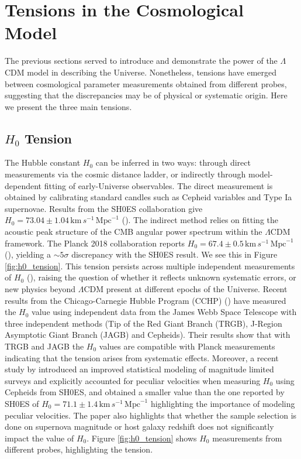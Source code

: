 \section{Tensions in the Cosmological Model} \label{sec:tensions}

The previous sections served to introduce and demonstrate the power of the $\Lambda$CDM model in describing the Universe. Nonetheless, tensions have emerged 
between cosmological parameter measurements obtained from different probes, suggesting that the discrepancies may be of physical or systematic origin. 
Here we present the three main tensions. \\

\subsection{$H_0$ Tension}

The Hubble constant $H_0$ can be inferred in two ways: through direct measurements via the cosmic distance ladder, or indirectly through model-dependent fitting of 
early-Universe observables. The direct measurement is obtained by calibrating standard candles such as Cepheid variables and Type Ia supernovae. 
Results from the SH0ES collaboration give $H_0 = 73.04 \pm 1.04\,\text{km}\,s^{-1}\,\text{Mpc}^{-1}$ (\cite{Riess_2022}). The indirect method relies on fitting the acoustic peak 
structure of the CMB angular power spectrum within the $\Lambda$CDM framework. The Planck 2018 collaboration reports $H_0 = 67.4 \pm 0.5\,\text{km}\,s^{-1}\,\text{Mpc}^{-1}$ 
(\cite{Planck_2018_params}), yielding a $\sim 5\sigma$ discrepancy with the SH0ES result. We see this in Figure \ref{fig:h0_tension}. This tension persists across multiple independent measurements of $H_0$ 
(\cite{DiValentino_2021}), raising the question of whether it reflects unknown systematic errors, or new physics beyond $\Lambda$CDM present at different 
epochs of the Universe. Recent results from the Chicago-Carnegie Hubble Program (CCHP) (\cite{Freedman_2025}) have measured the $H_0$ value using independent data from the James Webb Space Telescope 
with three independent methods (Tip of the Red Giant Branch (TRGB), J-Region Asymptotic Giant Branch (JAGB) and Cepheids). Their results show that with TRGB and 
JAGB the $H_0$ values are compatible with Planck measurements indicating that the tension arises from systematic effects. Moreover, a recent study by \cite{Stiskalek_2025} introduced an improved statistical modeling of magnitude limited surveys and explicitly accounted 
for peculiar velocities when measuring $H_0$ using Cepheids from SH0ES, and obtained a smaller value than the one reported by SH0ES of $H_0 = 71.1\pm 1.4 \, \text{km}\,s^{-1}\,\text{Mpc}^{-1}$ highlighting the importance of modeling peculiar velocities. 
The paper also highlights that whether the sample selection is done on supernova magnitude or host galaxy redshift does not significantly impact the value of $H_0$. 
Figure \ref{fig:h0_tension} shows $H_0$ measurements from different probes, highlighting the tension. \\


